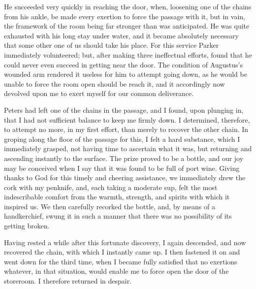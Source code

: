 He succeeded very quickly in reaching the door, when, loosening one of the
chains from his ankle, be made every exertion to force the passage with it, but
in vain, the framework of the room being far stronger than was anticipated. He
was quite exhausted with his long stay under water, and it became absolutely
necessary that some other one of us should take his place. For this service
Parker immediately volunteered; but, after making three ineffectual efforts,
found that he could never even succeed in getting near the door. The condition
of Augustus's wounded arm rendered it useless for him to attempt going down, as
he would be unable to force the room open should be reach it, and it accordingly
now devolved upon me to exert myself for our common deliverance. 

Peters had left one of the chains in the passage, and I found, upon plunging
in, that I had not sufficient balance to keep me firmly down. I determined,
therefore, to attempt no more, in my first effort, than merely to recover the
other chain. In groping along the floor of the passage for this, I felt a hard
substance, which I immediately grasped, not having time to ascertain what it
was, but returning and ascending instantly to the surface. The prize proved to
be a bottle, and our joy may be conceived when I say that it was found to be
full of port wine. Giving thanks to God for this timely and cheering assistance,
we immediately drew the cork with my penknife, and, each taking a moderate sup,
felt the most indescribable comfort from the warmth, strength, and spirits with
which it inspired us. We then carefully recorked the bottle, and, by means of a
handkerchief, swung it in such a manner that there was no possibility of its
getting broken. 

Having rested a while after this fortunate discovery, I again descended, and
now recovered the chain, with which I instantly came up. I then fastened it on
and went down for the third time, when I became fully satisfied that no
exertions whatever, in that situation, would enable me to force open the door of
the storeroom. I therefore returned in despair. 

